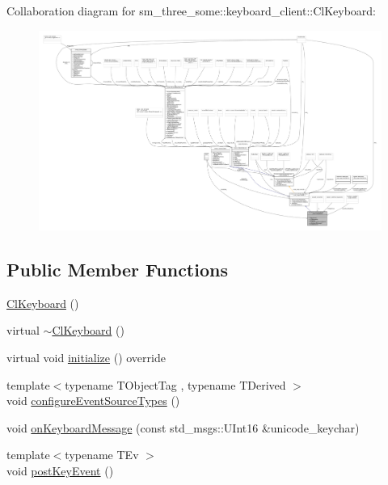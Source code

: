 Collaboration diagram for sm\+\_\+three\+\_\+some\+:\+:keyboard\+\_\+client\+:\+:Cl\+Keyboard\+:
\nopagebreak
\begin{figure}[H]
\begin{center}
\leavevmode
\includegraphics[width=350pt]{classsm__three__some_1_1keyboard__client_1_1ClKeyboard__coll__graph}
\end{center}
\end{figure}
\subsection*{Public Member Functions}
\begin{DoxyCompactItemize}
\item 
\hyperlink{classsm__three__some_1_1keyboard__client_1_1ClKeyboard_aed91dad1e75562fb65a29e9871030434}{Cl\+Keyboard} ()
\item 
virtual \hyperlink{classsm__three__some_1_1keyboard__client_1_1ClKeyboard_ac7c2347b58bafe89e1242bc4f9f0d276}{$\sim$\+Cl\+Keyboard} ()
\item 
virtual void \hyperlink{classsm__three__some_1_1keyboard__client_1_1ClKeyboard_a03947867843ecc8260c184592a34cc72}{initialize} () override
\item 
{\footnotesize template$<$typename T\+Object\+Tag , typename T\+Derived $>$ }\\void \hyperlink{classsm__three__some_1_1keyboard__client_1_1ClKeyboard_ad5d1ce49eb3eb7f187cc2df6e5b08cf0}{configure\+Event\+Source\+Types} ()
\item 
void \hyperlink{classsm__three__some_1_1keyboard__client_1_1ClKeyboard_ae5a79e852ff467f4b0c3aa3660ecc4db}{on\+Keyboard\+Message} (const std\+\_\+msgs\+::\+U\+Int16 \&unicode\+\_\+keychar)
\item 
{\footnotesize template$<$typename T\+Ev $>$ }\\void \hyperlink{classsm__three__some_1_1keyboard__client_1_1ClKeyboard_a1aecba744db201ef667e67c3f7c63333}{post\+Key\+Event} ()
\end{DoxyCompactItemize}
